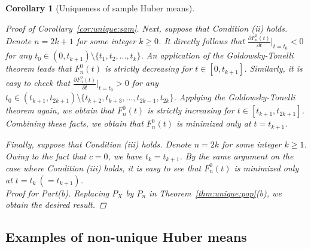 \documentclass[preprint]{imsart}
\theoremstyle{plain}
\newtheorem{corollary}{Corollary}
\theoremstyle{remark}
\begin{document}
\begin{appendix}
\begin{corollary}[Uniqueness of sample Huber means]
\begin{proof}[Proof of Corollary~\ref{cor:unique:sam}]
Next, suppose that Condition (ii) holds. Denote $n=2k+1$ for some integer $k \ge 0$. It directly follows that $\frac{\partial F^{0}_{n}(t)}{\partial t}|_{t=t_0} < 0$ for any $t_{0} \in (0, t_{k+1}) \setminus \{t_{1}, t_{2}, ..., t_{k}\}$. An application of the Goldowsky-Tonelli theorem \citep{goldowsky1928note} leads that $F^{0}_{n}(t)$ is strictly decreasing for $t \in [0, t_{k+1}]$. Similarly, it is easy to check that $\frac{\partial F^{0}_{n}(t)}{\partial t}|_{t=t_0} > 0$ for any $t_{0} \in (t_{k+1}, t_{2k+1}) \setminus \{t_{k+2}, t_{k+3}, ..., t_{2k-1}, t_{2k}\}$. Applying the Goldowsky-Tonelli theorem again, we obtain that $F^{0}_{n}(t)$ is strictly increasing for $t \in [t_{k+1}, t_{2k+1}]$. Combining these facts, we obtain that $F^{0}_{n}(t)$ is minimized only at $t=t_{k+1}$. 

Finally, suppose that Condition (iii) holds. Denote $n=2k$ for some integer $k \ge 1$. %
Owing to the fact that $c=0$, we have $t_{k} = t_{k+1}$. By the same argument on the case where Condition (iii) holds, it is easy to see that $F^{0}_{n}(t)$ is minimized only at $t=t_{k} ~ (=t_{k+1})$. \\



Proof for Part(b). Replacing $P_{X}$ by $P_{n}$ in Theorem~\ref{thm:unique:pop}(b), we obtain the desired result.
\end{proof}

\end{corollary}





\subsection{Examples of non-unique Huber means}\label{sec:nonuniqueHuber1}



\end{appendix}
\end{document}
